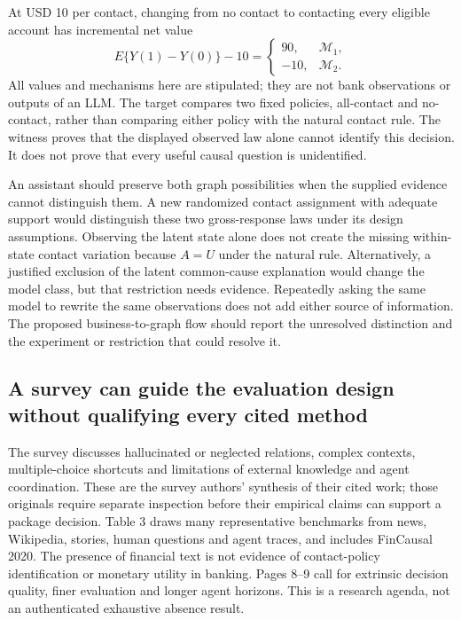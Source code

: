 At USD 10 per contact, changing from no contact to contacting every eligible
account has incremental net value
\begin{equation}
 E\{Y(1)-Y(0)\}-10=
 \begin{cases}
 90,&\mathcal M_1,\\
 -10,&\mathcal M_2.
 \end{cases}
 \label{exec23:context-net}
\end{equation}
All values and mechanisms here are stipulated; they are not bank observations
or outputs of an LLM. The target compares two fixed policies, all-contact and
no-contact, rather than comparing either policy with the natural contact rule.
The witness proves that the displayed observed law alone cannot identify this
decision. It does not prove that every useful causal question is unidentified.

An assistant should preserve both graph possibilities when the supplied
evidence cannot distinguish them. A new randomized contact assignment with
adequate support would distinguish these two gross-response laws under its
design assumptions. Observing the latent state alone does not create the
missing within-state contact variation because $A=U$ under the natural rule.
Alternatively, a justified exclusion of the latent common-cause explanation
would change the model class, but that restriction needs evidence. Repeatedly
asking the same model to rewrite the same observations does not add either
source of information. The proposed business-to-graph flow should report the
unresolved distinction and the experiment or restriction that could resolve it.

\subsection{A survey can guide the evaluation design without qualifying every cited method}
\label{exec23:context-evaluation}

The survey discusses hallucinated or neglected relations, complex contexts,
multiple-choice shortcuts and limitations of external knowledge and agent
coordination. These are the survey authors' synthesis of their cited work;
those originals require separate inspection before their empirical claims
can support a package decision. Table 3 draws many representative benchmarks
from news, Wikipedia, stories, human questions and agent traces, and includes
FinCausal 2020. The presence of financial text is not evidence of contact-policy
identification or monetary utility in banking. Pages 8--9 call for extrinsic
decision quality, finer evaluation and longer agent horizons. This is a
research agenda, not an authenticated exhaustive absence result.
\citep{exec23_contextual_causality_survey}

